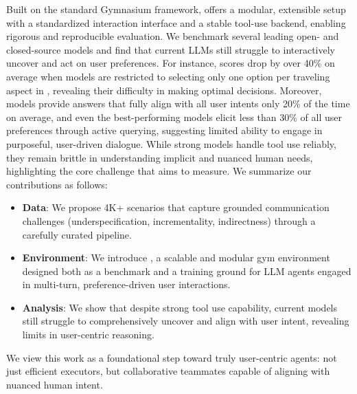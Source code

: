 Built on the standard Gymnasium framework, {\gymname} offers a modular, extensible setup with a standardized interaction interface and a stable tool-use backend, enabling rigorous and reproducible evaluation. We benchmark several leading open- and closed-source models and find that current LLMs still struggle to interactively uncover and act on user preferences.
For instance, scores drop by over 40\% on average when models are restricted to selecting only one option per traveling aspect in {\gymname}, revealing their difficulty in making optimal decisions. Moreover, models provide answers that fully align with all user intents only 20\% of the time on average, and even the best-performing models elicit less than 30\% of all user preferences through active querying, suggesting limited ability to engage in purposeful, user-driven dialogue. While strong models handle tool use reliably, they remain brittle in understanding implicit and nuanced human needs, highlighting the core challenge that {\gymname} aims to measure. We summarize our contributions as follows:
\begin{itemize}[topsep=2pt, partopsep=-3pt, leftmargin=8pt, itemsep=-3pt]
  \item \textbf{Data}: We propose 4K+ scenarios that capture grounded communication challenges (underspecification, incrementality, indirectness) through a carefully curated pipeline.
  \item \textbf{Environment}: We introduce {\gymname}, a scalable and modular gym environment designed both as a benchmark and a training ground for LLM agents engaged in multi-turn, preference-driven user interactions.
  \item \textbf{Analysis}: We show that despite strong tool use capability, current models still struggle to comprehensively uncover and align with user intent, revealing limits in user-centric reasoning.
\end{itemize}

We view this work as a foundational step toward truly user-centric agents: not just efficient executors, but collaborative teammates capable of aligning with nuanced human intent.

